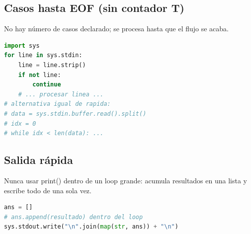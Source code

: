 \subsection{Casos hasta EOF (sin contador T)}

No hay número de casos declarado; se procesa hasta que el flujo se acaba.

\begin{lstlisting}[language=Python]
import sys
for line in sys.stdin:
    line = line.strip()
    if not line:
        continue
    # ... procesar linea ...
# alternativa igual de rapida:
# data = sys.stdin.buffer.read().split()
# idx = 0
# while idx < len(data): ...
\end{lstlisting}

\subsection{Salida rápida}

Nunca usar print() dentro de un loop grande: acumula resultados en una lista y escribe todo de una sola vez.

\begin{lstlisting}[language=Python]
ans = []
# ans.append(resultado) dentro del loop
sys.stdout.write("\n".join(map(str, ans)) + "\n")
\end{lstlisting}

